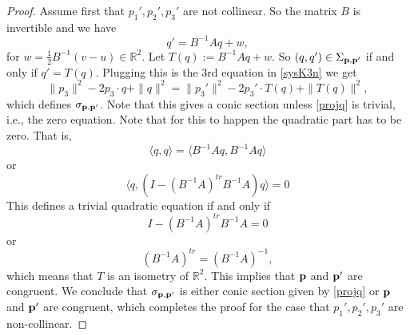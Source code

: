 \documentclass[10pt,a4paper]{amsart}
\newcommand{\RR}{\mathbb{R}}
\newcommand{\p}{{\bf p}}
\begin{document}
\begin{proof}
Assume first that $p_1',p_2',p_3'$ are not collinear. So the matrix $B$ is invertible and we have 
$$
q'=B^{-1}Aq+w,
$$
for $w = \frac12 B^{-1}(v-u) \in\RR^2$. Let $T(q):=B^{-1}Aq+w$. 
So $(q,q')\in \Sigma_{\p,\p'}$ if and only if $q'=T(q)$. Plugging this is the 3rd equation in \eqref{sysK3n} we get
\begin{equation}\label{projq}
\|p_3\|^2-2p_3\cdot q+\|q\|^2=\|p_3'\|^2-2p_3'\cdot T(q)+\|T(q)\|^2,
\end{equation}
which defines $\sigma_{\p,\p'}$. Note that this gives a conic section unless \eqref{projq} is trivial, i.e., the zero equation. 
Note that for this to happen the quadratic part has to be zero. That is, 
$$
\langle q,q\rangle =\langle B^{-1}Aq,B^{-1}A q\rangle 
$$
or
$$
\langle q,\left(I-(B^{-1}A)^{tr}B^{-1}A\right)q\rangle =0
$$
This defines a trivial quadratic equation if and only if 
$$
I-(B^{-1}A)^{tr}B^{-1}A=0
$$
or
$$
(B^{-1}A)^{tr}=(B^{-1}A)^{-1},
$$
which means that $T$ is an isometry of $\RR^2$. 
This implies that $\p$ and $\p'$ are congruent.
We conclude that $\sigma_{\p,\p'}$ is either conic section given by  \eqref{projq} or $\p$ and $\p'$ are congruent, which completes the proof for the case that $p_1',p_2',p_3'$ are non-collinear. 


\end{proof}
\end{document}
